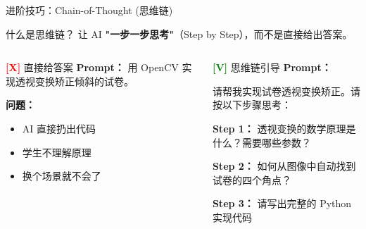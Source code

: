 \begin{frame}{进阶技巧：Chain-of-Thought (思维链)}
	\begin{block}{什么是思维链？}
		让 AI \textbf{"一步一步思考"}（Step by Step），而不是直接给出答案。
	\end{block}

	\vspace{0.3cm}

	\begin{columns}
		\begin{alertblock}{\textcolor{red}{\textbf{[X]}} 直接给答案}
			\textbf{Prompt：} 用 OpenCV 实现透视变换矫正倾斜的试卷。

			\vspace{0.2cm}

			\textbf{问题：}
			\begin{itemize}
				\item AI 直接扔出代码
				\item 学生不理解原理
				\item 换个场景就不会了
			\end{itemize}
		\end{alertblock}

		\begin{exampleblock}{\textcolor{green}{\textbf{[V]}} 思维链引导}
			\textbf{Prompt：}

			请帮我实现试卷透视变换矫正。请按以下步骤思考：

			\textbf{Step 1：} 透视变换的数学原理是什么？需要哪些参数？

			\textbf{Step 2：} 如何从图像中自动找到试卷的四个角点？

			\textbf{Step 3：} 请写出完整的 Python 实现代码
		\end{exampleblock}
	\end{columns}
\end{frame}

